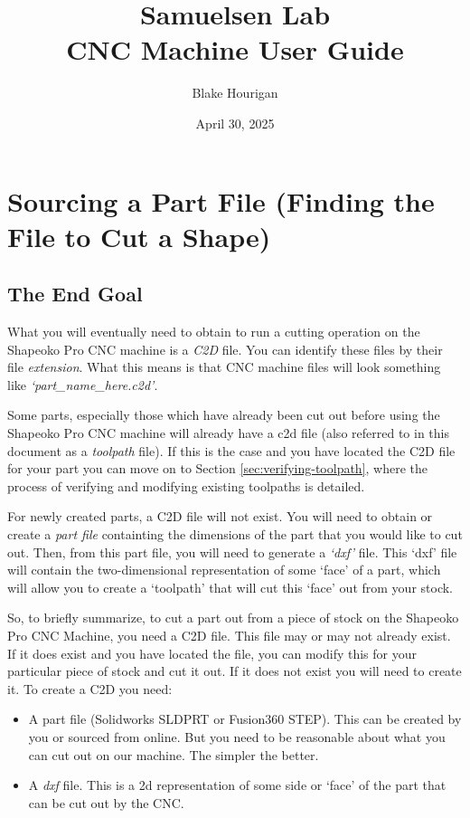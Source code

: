 \documentclass{article}
\title{Samuelsen Lab\\CNC Machine User Guide}
\author{Blake Hourigan}
\date{April 30, 2025}
\begin{document}
\maketitle
\clearpage
\tableofcontents
\clearpage


\section{Sourcing a Part File (Finding the File to Cut a Shape)}
\subsection{The End Goal}
What you will eventually need to obtain to run a cutting operation on the Shapeoko Pro CNC machine is a \textit{C2D} file. You can identify these files
by their file \textit{extension}. What this means is that CNC machine files will look something like \textit{`part\_name\_here.c2d'}.

Some parts, especially those which have already been cut out before using the Shapeoko Pro CNC machine will already have a c2d file (also referred to 
in this document as a \textit{toolpath} file). If this is the case and you have located the C2D file for your part you can move on to Section 
\ref{sec:verifying-toolpath}, where the process of verifying and modifying existing toolpaths is detailed.

For newly created parts, a C2D file will not exist. You will need to obtain or create a \textit{part file} containting the dimensions of the part 
that you would like to cut out. Then, from this part file, you will need to generate a \textit{`dxf'} file. This `dxf' file will contain the 
two-dimensional representation of some `face' of a part, which will allow you to create a `toolpath' that will cut this `face' out from your stock. 

So, to briefly summarize, to cut a part out from a piece of stock on the Shapeoko Pro CNC Machine, you need a C2D file. This file may or may not already
exist. If it does exist and you have located the file, you can modify this for your particular piece of stock and cut it out. If it does not exist you
will need to create it. To create a C2D you need:
\begin{itemize}
    \item A part file (Solidworks SLDPRT or Fusion360 STEP). This can be created by you or sourced from online. But you need to be reasonable about 
        what you can cut out on our machine. The simpler the better.
    \item A \textit{dxf} file. This is a 2d representation of some side or `face' of the part that can be cut out by the CNC. 
\end{itemize}
\end{document}
